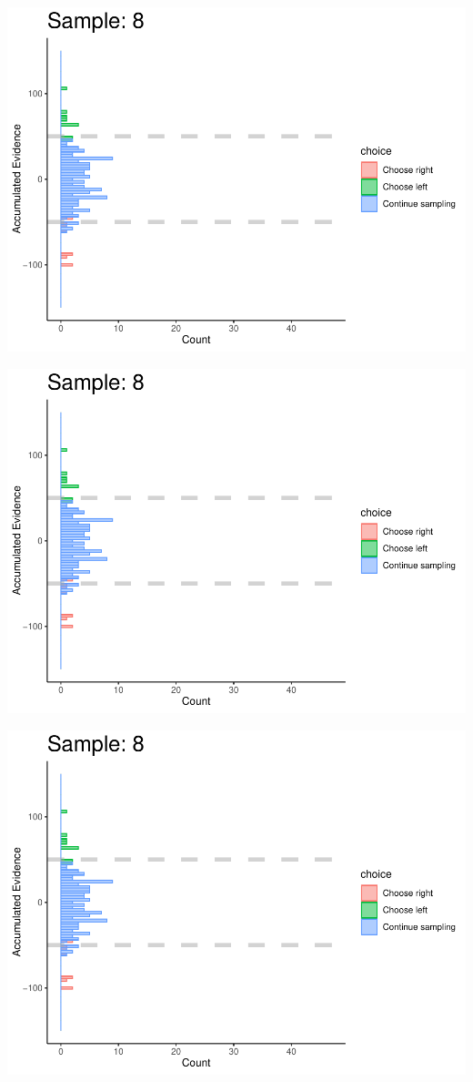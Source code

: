 \documentclass[
]{book}
\begin{document}
\begin{center}\includegraphics[width=0.8\linewidth]{LateNightBayes_files/figure-latex/fixed_check-73} \end{center}

\begin{center}\includegraphics[width=0.8\linewidth]{LateNightBayes_files/figure-latex/fixed_check-74} \end{center}

\begin{center}\includegraphics[width=0.8\linewidth]{LateNightBayes_files/figure-latex/fixed_check-75} \end{center}
\end{document}
